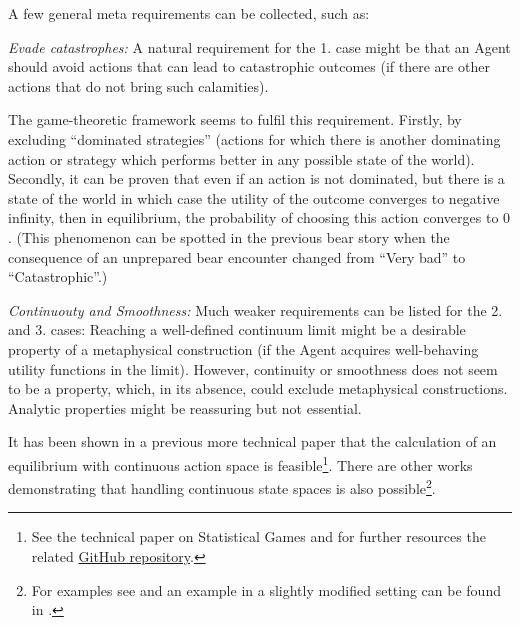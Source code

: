 \documentclass{article}
\begin{document}
A few general meta requirements can be collected, such as:

{\it Evade catastrophes:}
A natural requirement for the 1. case might be that an Agent should avoid actions that can lead to catastrophic outcomes (if there are other actions that do not bring such calamities).

The game-theoretic framework seems to fulfil this requirement. Firstly, by excluding ``dominated strategies'' (actions for which there is another dominating action or strategy which performs better in any possible state of the world). Secondly, it can be proven that even if an action is not dominated, but there is a state of the world in which case the utility of the outcome converges to negative infinity, then in equilibrium, the probability of choosing this action converges to $0$. (This phenomenon can be spotted in the previous bear story when the consequence of an unprepared bear encounter changed from ``Very bad'' to ``Catastrophic''.)

{\it Continuouty and Smoothness:}
Much weaker requirements can be listed for the 2. and 3. cases:
Reaching a well-defined continuum limit might be a desirable property of a metaphysical construction (if the Agent acquires well-behaving utility functions in the limit).
However, continuity or smoothness does not seem to be a property, which, in its absence, could exclude metaphysical constructions.
Analytic properties might be reassuring but not essential.

It has been shown in a previous more technical paper that the calculation of an equilibrium with continuous action space is feasible\footnote{See the technical paper on Statistical Games \cite{arxiv:StatisticalGamesKonczer2024} and for further resources the related \href{https://github.com/Konczer/UncertaintyTheory/tree/main/StatisticalGames}{GitHub repository}.}. There are other works demonstrating that handling continuous state spaces is also possible\footnote{For examples see \cite{Kashyap1971,Kashyap1974} and an example in a slightly modified setting can be found in \cite{paper:Abbott2018,paper:Abbott2023}.}. 
\end{document}
